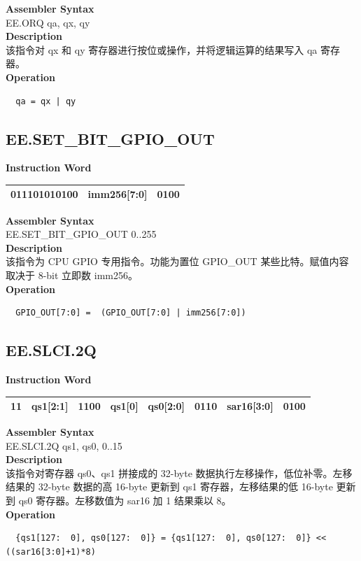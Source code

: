 \textbf{Assembler Syntax} \\
EE.ORQ qa, qx, qy \\
\textbf{Description} \\
该指令对 qx 和 qy 寄存器进行按位或操作，并将逻辑运算的结果写入 qa 寄存器。\\
\textbf{Operation}
\begin{lstlisting}
  qa = qx | qy
\end{lstlisting}

\clearpage
\subsection{EE.SET\_BIT\_GPIO\_OUT}\label{instruction:EESETBITGPIOOUT}
\setlength\tabcolsep{6pt}
\textbf{Instruction Word} \\
\begin{tabular}{|c|c|c|}
	\hline
	011101010100 & imm256[7:0] & 0100 \\
	\hline
\end{tabular}

\textbf{Assembler Syntax} \\
EE.SET\_BIT\_GPIO\_OUT 0..255 \\
\textbf{Description} \\
该指令为 CPU GPIO 专用指令。功能为置位 GPIO\_OUT 某些比特。赋值内容取决于 8-bit 立即数 imm256。\\
\textbf{Operation}
\begin{lstlisting}
  GPIO_OUT[7:0] =  (GPIO_OUT[7:0] | imm256[7:0])
\end{lstlisting}

\clearpage
\subsection{EE.SLCI.2Q}\label{instruction:EESLCI2Q}
\setlength\tabcolsep{6pt}
\textbf{Instruction Word} \\
\begin{tabular}{|c|c|c|c|c|c|c|c|}
	\hline
	11 & qs1[2:1] & 1100 & qs1[0] & qs0[2:0] & 0110 & sar16[3:0] & 0100 \\
	\hline
\end{tabular}

\textbf{Assembler Syntax} \\
EE.SLCI.2Q qs1, qs0, 0..15 \\
\textbf{Description} \\
该指令对寄存器 qs0、qs1 拼接成的 32-byte 数据执行左移操作，低位补零。左移结果的 32-byte 数据的高 16-byte 更新到 qs1 寄存器，左移结果的低 16-byte 更新到 qs0 寄存器。左移数值为 sar16 加 1 结果乘以 8。\\
\textbf{Operation}
\begin{lstlisting}
  {qs1[127:  0], qs0[127:  0]} = {qs1[127:  0], qs0[127:  0]} << ((sar16[3:0]+1)*8)
\end{lstlisting}

